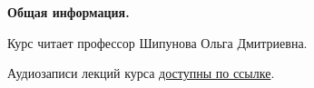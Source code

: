 \documentclass[main.tex]{subfiles}
\begin{document}
{\parindent0pt

\textbf{Общая информация.}

Курс читает профессор Шипунова Ольга Дмитриевна.

Аудиозаписи лекций курса \href{https://drive.google.com/drive/folders/1iSx2EjJJ98rhPpOsM4xGcJA7-7qitQHM?usp=sharing}{доступны по ссылке}.
}
\end{document}
